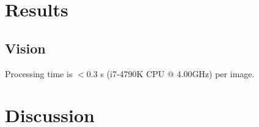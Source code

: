\documentclass[10pt,twocolumn,letterpaper]{article}
\begin{document}
\section{Results}

\subsection{Vision}
Processing time is $< 0.3$ s (i7-4790K CPU @ 4.00GHz) per image.


\section{Discussion}

{\small
\printbibliography
}
\end{document}
